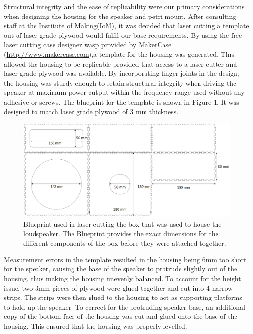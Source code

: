 Structural integrity and the ease of replicability were our primary considerations when designing the housing for the speaker and petri mount. After consulting staff at the Institute of Making(IoM), it was decided that laser cutting a template out of laser grade plywood would fulfil our base requirements. By using the free laser cutting case designer wasp provided by MakerCase (\url{http://www.makercase.com}),a template for the housing was generated. This allowed the housing to be replicable provided that access to a laser cutter and laser grade plywood was available. By incorporating finger joints in the design, the housing was sturdy enough to retain structural integrity when driving the speaker at maximum power output within the frequency range used without any adhesive or screws. The blueprint for the template is shown in Figure \ref{fig:blueprint}. It was designed to match laser grade plywood of 3 mm thickness.

\begin{figure}[htbp]
\includegraphics[width=\textwidth]{prototype/exp_rep_imgs/Blueprint.png}
\centering
\caption{Blueprint used in laser cutting the box that was used to house the loudspeaker. The Blueprint provides the exact dimensions for the different components of the box before they were attached together.  }
\centering
\label{fig:blueprint}
\end{figure}

Measurement errors in the template resulted in the housing being 6mm too short for the speaker, causing the base of the speaker to protrude slightly out of the housing, thus making the housing unevenly balanced. To account for the height issue, two 3mm pieces of plywood were glued together and cut into 4 narrow strips. The strips were then glued to the housing to act as supporting platforms to hold up the speaker. To correct for the protruding speaker base, an additional copy of the bottom face of the housing was cut and glued onto the base of the housing. This ensured that the housing was properly levelled.

